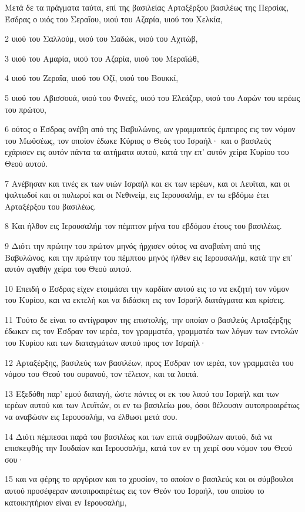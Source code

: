 \par Μετά δε τα πράγματα ταύτα, επί της βασιλείας Αρταξέρξου βασιλέως της Περσίας, Έσδρας ο υιός του Σεραΐου, υιού του Αζαρία, υιού του Χελκία,
\par 2 υιού του Σαλλούμ, υιού του Σαδώκ, υιού του Αχιτώβ,
\par 3 υιού του Αμαρία, υιού του Αζαρία, υιού του Μεραϊώθ,
\par 4 υιού του Ζεραΐα, υιού του Οζί, υιού του Βουκκί,
\par 5 υιού του Αβισσουά, υιού του Φινεές, υιού του Ελεάζαρ, υιού του Ααρών του ιερέως του πρώτου,
\par 6 ούτος ο Έσδρας ανέβη από της Βαβυλώνος, ων γραμματεύς έμπειρος εις τον νόμον του Μωϋσέως, τον οποίον έδωκε Κύριος ο Θεός του Ισραήλ· και ο βασιλεύς εχάρισεν εις αυτόν πάντα τα αιτήματα αυτού, κατά την επ' αυτόν χείρα Κυρίου του Θεού αυτού.
\par 7 Ανέβησαν και τινές εκ των υιών Ισραήλ και εκ των ιερέων, και οι Λευΐται, και οι ψαλτωδοί και οι πυλωροί και οι Νεθινείμ, εις Ιερουσαλήμ, εν τω εβδόμω έτει Αρταξέρξου του βασιλέως.
\par 8 Και ήλθον εις Ιερουσαλήμ τον πέμπτον μήνα του εβδόμου έτους του βασιλέως.
\par 9 Διότι την πρώτην του πρώτον μηνός ήρχισεν ούτος να αναβαίνη από της Βαβυλώνος, και την πρώτην του πέμπτου μηνός ήλθεν εις Ιερουσαλήμ, κατά την επ' αυτόν αγαθήν χείρα του Θεού αυτού.
\par 10 Επειδή ο Έσδρας είχεν ετοιμάσει την καρδίαν αυτού εις το να εκζητή τον νόμον του Κυρίου, και να εκτελή και να διδάσκη εις τον Ισραήλ διατάγματα και κρίσεις.
\par 11 Τούτο δε είναι το αντίγραφον της επιστολής, την οποίαν ο βασιλεύς Αρταξέρξης έδωκεν εις τον Έσδραν τον ιερέα, τον γραμματέα, γραμματέα των λόγων των εντολών του Κυρίου και των διαταγμάτων αυτού προς τον Ισραήλ·
\par 12 Αρταξέρξης, βασιλεύς των βασιλέων, προς Έσδραν τον ιερέα, τον γραμματέα του νόμου του Θεού του ουρανού, τον τέλειον, και τα λοιπά.
\par 13 Εξεδόθη παρ' εμού διαταγή, ώστε πάντες οι εκ του λαού του Ισραήλ και των ιερέων αυτού και των Λευϊτών, οι εν τω βασιλείω μου, όσοι θέλουσιν αυτοπροαιρέτως να αναβώσιν εις Ιερουσαλήμ, να έλθωσι μετά σου.
\par 14 Διότι πέμπεσαι παρά του βασιλέως και των επτά συμβούλων αυτού, διά να επισκεφθής την Ιουδαίαν και Ιερουσαλήμ, κατά τον εν τη χειρί σου νόμον του Θεού σου·
\par 15 και να φέρης το αργύριον και το χρυσίον, το οποίον ο βασιλεύς και οι σύμβουλοι αυτού προσέφεραν αυτοπροαιρέτως εις τον Θεόν του Ισραήλ, του οποίου το κατοικητήριον είναι εν Ιερουσαλήμ,
